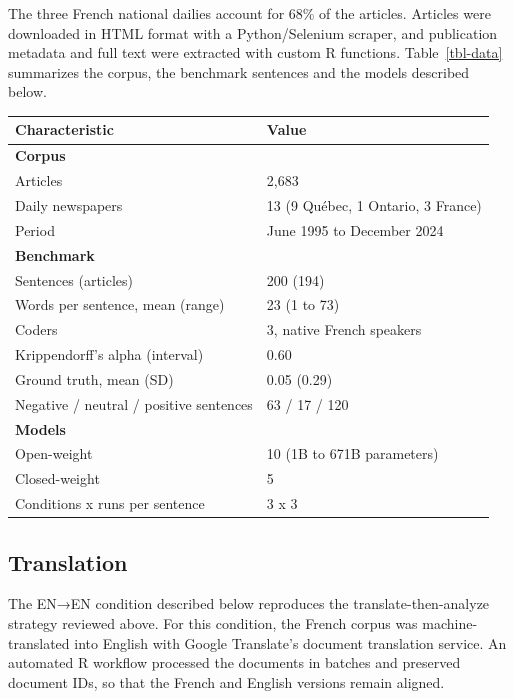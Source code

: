 \documentclass[
  man,
  floatsintext,
  longtable,
  nolmodern,
  notxfonts,
  notimes,
  colorlinks=true,linkcolor=blue,citecolor=blue,urlcolor=blue]{apa7}
\begin{document}
The three French national dailies account for 68\% of the articles.
Articles were downloaded in HTML format with a Python/Selenium scraper,
and publication metadata and full text were extracted with custom R
functions. Table~\ref{tbl-data} summarizes the corpus, the benchmark
sentences and the models described below.

\begin{table}

{\caption{{Corpus, Benchmark Sentences and Models}{\label{tbl-data}}}
\vspace{-20pt}}

\begin{longtable}[]{@{}ll@{}}
\toprule\noalign{}
Characteristic & Value \\
\midrule\noalign{}
\endhead
\bottomrule\noalign{}
\endlastfoot
\textbf{Corpus} & \\
Articles & 2,683 \\
Daily newspapers & 13 (9 Québec, 1 Ontario, 3 France) \\
Period & June 1995 to December 2024 \\
\textbf{Benchmark} & \\
Sentences (articles) & 200 (194) \\
Words per sentence, mean (range) & 23 (1 to 73) \\
Coders & 3, native French speakers \\
Krippendorff's alpha (interval) & 0.60 \\
Ground truth, mean (SD) & 0.05 (0.29) \\
Negative / neutral / positive sentences & 63 / 17 / 120 \\
\textbf{Models} & \\
Open-weight & 10 (1B to 671B parameters) \\
Closed-weight & 5 \\
Conditions x runs per sentence & 3 x 3 \\
\end{longtable}

\end{table}

\subsection{Translation}\label{translation}

The EN→EN condition described below reproduces the
translate-then-analyze strategy reviewed above. For this condition, the
French corpus was machine-translated into English with Google
Translate's document translation service. An automated R workflow
processed the documents in batches and preserved document IDs, so that
the French and English versions remain aligned.
\end{document}

